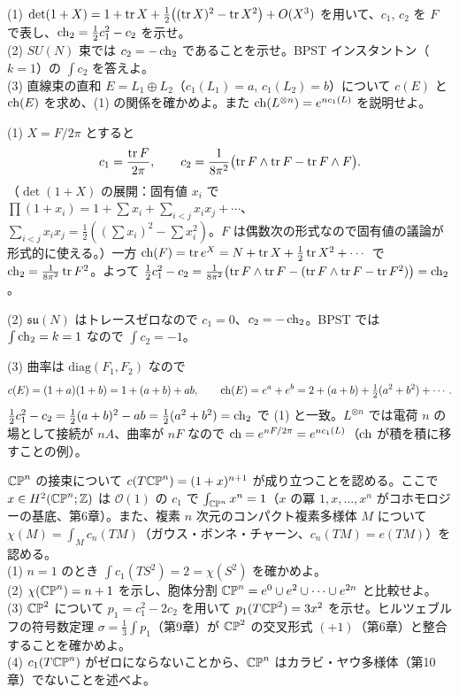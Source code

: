 \begin{problem}[難易度 A]\label{ch08-prob-chernpoly}
(1) $\det(1+X)=1+\tr X+\frac12\bigl((\tr X)^2-\tr X^2\bigr)+O(X^3)$ を用いて、$c_1$, $c_2$ を $F$ で表し、$\operatorname{ch}_2=\frac12c_1^2-c_2$ を示せ。\\
(2) $SU(N)$ 束では $c_2=-\operatorname{ch}_2$ であることを示せ。BPST インスタントン（$k=1$）の $\int c_2$ を答えよ。\\
(3) 直線束の直和 $E=L_1\oplus L_2$（$c_1(L_1)=a$, $c_1(L_2)=b$）について $c(E)$ と $\operatorname{ch}(E)$ を求め、(1) の関係を確かめよ。また $\operatorname{ch}(L^{\otimes n})=e^{nc_1(L)}$ を説明せよ。
\end{problem}

\begin{solution}
(1) $X=F/2\pi$ とすると
\[
c_1=\frac{\tr F}{2\pi},\qquad c_2=\frac{1}{8\pi^2}\bigl(\tr F\wedge\tr F-\tr F\wedge F\bigr).
\]
（$\det(1+X)$ の展開：固有値 $x_i$ で $\prod(1+x_i)=1+\sum x_i+\sum_{i<j}x_ix_j+\cdots$、$\sum_{i<j}x_ix_j=\frac12((\sum x_i)^2-\sum x_i^2)$。$F$ は偶数次の形式なので固有値の議論が形式的に使える。）一方 $\operatorname{ch}(F)=\tr e^{X}=N+\tr X+\frac12\tr X^2+\cdots$ で $\operatorname{ch}_2=\frac1{8\pi^2}\tr F^2$。よって $\frac12c_1^2-c_2=\frac1{8\pi^2}\bigl(\tr F\wedge\tr F-(\tr F\wedge\tr F-\tr F^2)\bigr)=\operatorname{ch}_2$。

(2) $\mathfrak{su}(N)$ はトレースゼロなので $c_1=0$、$c_2=-\operatorname{ch}_2$。BPST では $\int\operatorname{ch}_2=k=1$ なので $\int c_2=-1$。

(3) 曲率は $\mathrm{diag}(F_1,F_2)$ なので
\[
c(E)=(1+a)(1+b)=1+(a+b)+ab,\qquad\operatorname{ch}(E)=e^a+e^b=2+(a+b)+\tfrac12(a^2+b^2)+\cdots .
\]
$\frac12c_1^2-c_2=\frac12(a+b)^2-ab=\frac12(a^2+b^2)=\operatorname{ch}_2$ で (1) と一致。$L^{\otimes n}$ では電荷 $n$ の場として接続が $nA$、曲率が $nF$ なので $\operatorname{ch}=e^{nF/2\pi}=e^{nc_1(L)}$（$\operatorname{ch}$ が積を積に移すことの例）。
\end{solution}

\begin{problem}[難易度 B]\label{ch08-prob-cpn}
$\mathbb{CP}^n$ の接束について $c(T\mathbb{CP}^n)=(1+x)^{n+1}$ が成り立つことを認める。ここで $x\in H^2(\mathbb{CP}^n;\mathbb{Z})$ は $\mathcal O(1)$ の $c_1$ で $\int_{\mathbb{CP}^n}x^n=1$（$x$ の冪 $1,x,\dots,x^n$ がコホモロジーの基底、第6章）。また、複素 $n$ 次元のコンパクト複素多様体 $M$ について $\chi(M)=\int_Mc_n(TM)$（ガウス・ボンネ・チャーン、$c_n(TM)=e(TM)$）を認める。\\
(1) $n=1$ のとき $\int c_1(TS^2)=2=\chi(S^2)$ を確かめよ。\\
(2) $\chi(\mathbb{CP}^n)=n+1$ を示し、胞体分割 $\mathbb{CP}^n=e^0\cup e^2\cup\cdots\cup e^{2n}$ と比較せよ。\\
(3) $\mathbb{CP}^2$ について $p_1=c_1^2-2c_2$ を用いて $p_1(T\mathbb{CP}^2)=3x^2$ を示せ。ヒルツェブルフの符号数定理 $\sigma=\frac13\int p_1$（第9章）が $\mathbb{CP}^2$ の交叉形式 $(+1)$（第6章）と整合することを確かめよ。\\
(4) $c_1(T\mathbb{CP}^n)$ がゼロにならないことから、$\mathbb{CP}^n$ はカラビ・ヤウ多様体（第10章）でないことを述べよ。
\end{problem}

